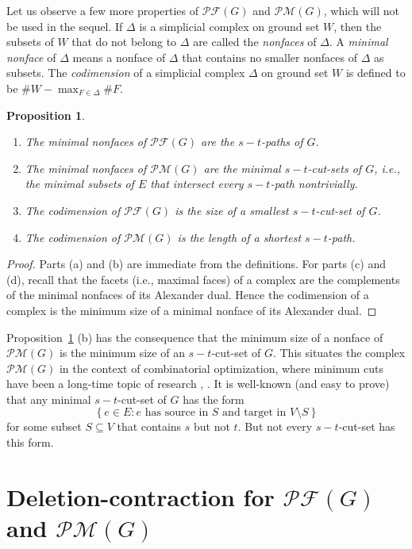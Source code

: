 \documentclass[12pt]{amsart}
\newtheorem{proposition}[theorem]{Proposition}
\theoremstyle{definition}
\newcommand{\set}[1]{\left\{ #1 \right\}}
\newcommand{\Pm}[1]{\mathcal{PM}\left(#1\right)}
\newcommand{\Pf}[1]{\mathcal{PF}\left(#1\right)}
\begin{document}
Let us observe a few more properties of $\Pf{G}$ and $\Pm{G}$, which will not be used in the sequel.
If $\Delta$ is a simplicial complex on ground set $W$, then the subsets of $W$ that do not belong to $\Delta$ are called the \emph{nonfaces} of $\Delta$.
A \emph{minimal nonface} of $\Delta$ means a nonface of $\Delta$ that contains no smaller nonfaces of $\Delta$ as subsets.
The \emph{codimension} of a simplicial complex $\Delta$ on ground set $W$ is defined to be $\# W - \max_{F \in \Delta} \# F$.

\begin{proposition} \label{prop.min-nonfaces} \hfill
    \begin{enumerate}
        \item[(a)] The minimal nonfaces of $\Pf{G}$ are the $s-t$-paths of $G$.
        \item[(b)] The minimal nonfaces of $\Pm{G}$ are the minimal $s-t$-cut-sets of $G$, i.e., the minimal subsets of $E$ that intersect every $s-t$-path nontrivially.    
        \item[(c)] The codimension of $\Pf{G}$ is the size of a smallest $s-t$-cut-set of $G$.
        \item[(d)] The codimension of $\Pm{G}$ is the length of a shortest $s-t$-path.
    \end{enumerate}
\end{proposition}
\begin{proof}
    Parts (a) and (b) are immediate from the definitions.
    For parts (c) and (d), recall that the facets (i.e., maximal faces) of a complex are the complements of the minimal nonfaces of its Alexander dual.
    Hence the codimension of a complex is the minimum size of a minimal nonface of its Alexander dual.
\end{proof}

Proposition~\ref{prop.min-nonfaces} (b) has the consequence that the minimum size of a nonface of $\Pm{G}$ is the minimum size of an $s-t$-cut-set of $G$. This situates the complex $\Pm{G}$ in the context of combinatorial optimization, where minimum cuts have been a long-time topic of research \cite{PicQue}, \cite{ForFul62}.
It is well-known (and easy to prove) that any minimal $s-t$-cut-set of $G$ has the form
\[
\set{e \in E : e \text{ has source in } S \text{ and target in } V \setminus S}
\]
for some subset $S \subseteq V$ that contains $s$ but not $t$. But not every $s-t$-cut-set has this form.


\section{\label{sect.delcont}Deletion-contraction for $\Pf{G}$ and $\Pm{G}$}
\end{document}
